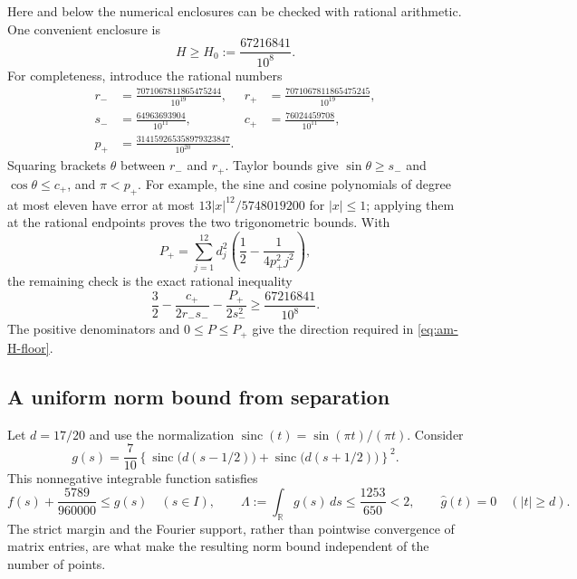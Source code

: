 \documentclass[11pt,reqno]{amsart}
\numberwithin{equation}{section}
\begin{document}
Here and below the numerical enclosures can be checked with rational
arithmetic. One convenient enclosure is
\begin{equation}
 H\ge H_0:=\frac{67216841}{10^8}.
 \label{eq:am-H-floor}
\end{equation}
For completeness, introduce the rational numbers
\[
\begin{aligned}
 r_-&=\frac{7071067811865475244}{10^{19}},&
 r_+&=\frac{7071067811865475245}{10^{19}},\\
 s_-&=\frac{64963693904}{10^{11}},&
 c_+&=\frac{76024459708}{10^{11}},\\
 p_+&=\frac{314159265358979323847}{10^{20}}.
\end{aligned}
\]
Squaring brackets $\theta$ between $r_-$ and $r_+$. Taylor bounds give
$\sin\theta\ge s_-$ and $\cos\theta\le c_+$, and $\pi<p_+$.
For example, the sine and cosine polynomials of degree at most eleven
have error at most $13|x|^{12}/5748019200$ for $|x|\le1$; applying
them at the rational endpoints proves the two trigonometric bounds.
With
\[
 P_+=\sum_{j=1}^{12}d_j^2\left(\frac12-\frac1{4p_+^2j^2}\right),
\]
the remaining check is the exact rational inequality
\begin{equation}
 \frac32-\frac{c_+}{2r_-s_-}-\frac{P_+}{2s_-^2}
 \ge\frac{67216841}{10^8}.
 \label{eq:am-H-rational-check}
\end{equation}
The positive denominators and $0\le P\le P_+$ give the direction
required in \eqref{eq:am-H-floor}.

\subsection{A uniform norm bound from separation}

Let $d=17/20$ and use the normalization
$\operatorname{sinc}(t)=\sin(\pi t)/(\pi t)$. Consider
\begin{equation}
 g(s)=\frac7{10}\left\{
  \operatorname{sinc}\bigl(d(s-1/2)\bigr)+
  \operatorname{sinc}\bigl(d(s+1/2)\bigr)\right\}^2.
 \label{eq:am-majorant}
\end{equation}
This nonnegative integrable function satisfies
\begin{equation}
 f(s)+\frac{5789}{960000}\le g(s)\quad(s\in I),\qquad
 \Lambda:=\int_{\mathbb R}g(s)\,ds\le\frac{1253}{650}<2,
 \qquad \widehat g(t)=0\quad(|t|\ge d).
 \label{eq:am-majorant-properties}
\end{equation}
The strict margin and the Fourier support, rather than pointwise
convergence of matrix entries, are what make the resulting norm bound
independent of the number of points.
\end{document}
